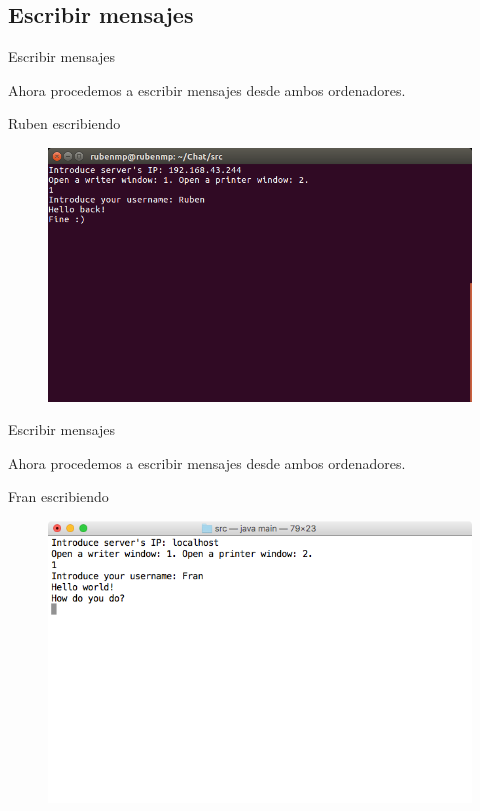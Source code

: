 

\subsection{Escribir mensajes}
\begin{frame}{Escribir mensajes}
	\begin{block}{ }
		Ahora procedemos a escribir mensajes desde ambos ordenadores.
	\end{block}
	
	\begin{exampleblock}{Ruben escribiendo}
		\begin{figure}[H]
			\includegraphics[scale=0.4]{./Imagenes/rubenwriter2.png}
		\end{figure}
	\end{exampleblock}
\end{frame}




\begin{frame}{Escribir mensajes}
	\begin{block}{ }
		Ahora procedemos a escribir mensajes desde ambos ordenadores.
	\end{block}
	
	\begin{exampleblock}{Fran escribiendo}
		\begin{figure}[H]
			\includegraphics[scale=0.4]{./Imagenes/franwriter2.png}
		\end{figure}
	\end{exampleblock}
\end{frame}


